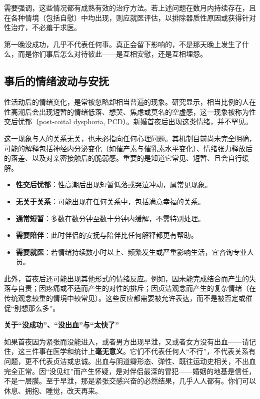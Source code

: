 \documentclass[12pt,UTF8]{ctexbook}
\begin{document}
需要强调，这些情况都有成熟有效的治疗方法。若上述问题在数月内持续存在，且在各种情境（包括自慰）中均出现，则应就医评估，以排除器质性原因或获得针对性治疗，不必羞于求医。

\begin{tcolorbox}[colback=pink!5!white,colframe=red!50!black,title=贴心小叮咛]
第一晚没成功，几乎不代表任何事。真正会留下影响的，不是那天晚上发生了什么，而是你们事后怎么对待彼此——是互相安慰，还是互相埋怨。
\end{tcolorbox}

\subsection{事后的情绪波动与安抚}

性活动后的情绪变化，是常被忽略却相当普遍的现象。研究显示，相当比例的人在性高潮后会出现短暂的情绪低落、想哭、焦虑或莫名的空虚感，这一现象被称为性交后忧郁（post-coital dysphoria, PCD）。新婚首夜后出现这类情绪，并不罕见。

这一现象与人的关系无关，也未必指向任何心理问题。其机制目前尚未完全明确，可能的解释包括神经内分泌变化（如催产素与催乳素水平变化）、情绪张力释放后的落差、以及对亲密接触后的脆弱感。重要的是知道它常见、短暂、且会自行缓解。

\begin{itemize}
\item \textbf{性交后忧郁}：性高潮后出现短暂低落或哭泣冲动，属常见现象。
\item \textbf{无关于关系}：可能出现在任何关系中，包括满意幸福的关系。
\item \textbf{通常短暂}：多数在数分钟至数十分钟内缓解，不需特别处理。
\item \textbf{需要陪伴}：此时伴侣的安抚与陪伴比任何解释都更有帮助。
\item \textbf{需要就医}：若情绪持续数小时以上、频繁发生或严重影响生活，宜咨询专业人员。
\end{itemize}

此外，首夜后还可能出现其他形式的情绪反应。例如，因未能完成结合而产生的失落与自责；因疼痛或不适而产生的对性的排斥；因贞洁观念而产生的复杂情绪（在传统观念较重的情境中较常见）。这些反应都需要被允许表达，而不是被否定或催促“别想那么多”。

\textbf{关于“没成功”、“没出血”与“太快了”}

如果首夜因为紧张而没能进入，或者男方出现早泄，又或者女方没有出血——请记住，这三件事在医学和统计上\textbf{毫无意义}。它们不代表任何人“不行”，不代表关系有问题，更不代表贞洁或忠诚。出血与阴道瓣形态、弹性、既往运动史相关，不出血完全正常。因“没见红”而产生怀疑，是对伴侣最深的冒犯——婚姻的地基是信任，不是一层膜。至于早泄，那是紧张交感兴奋的必然结果，几乎人人都有。你们可以休息、拥抱、睡觉，改天再来。
\end{document}
